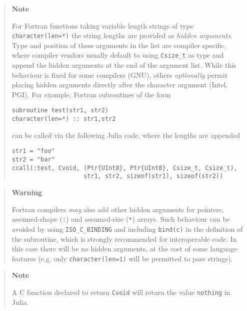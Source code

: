 \begin{quote}
\textbf{Note}

For Fortran functions taking variable length strings of type \texttt{character(len=*)} the string lengths are provided as \emph{hidden arguments}. Type and position of these arguments in the list are compiler specific, where compiler vendors usually default to using \texttt{Csize\_t} as type and append the hidden arguments at the end of the argument list. While this behaviour is fixed for some compilers (GNU), others \emph{optionally} permit placing hidden arguments directly after the character argument (Intel, PGI). For example, Fortran subroutines of the form


\begin{lstlisting}
subroutine test(str1, str2)
character(len=*) :: str1,str2
\end{lstlisting}

can be called via the following Julia code, where the lengths are appended


\begin{verbatim}
str1 = "foo"
str2 = "bar"
ccall(:test, Cvoid, (Ptr{UInt8}, Ptr{UInt8}, Csize_t, Csize_t),
                    str1, str2, sizeof(str1), sizeof(str2))
\end{verbatim}

\end{quote}


\begin{quote}
\textbf{Warning}

Fortran compilers \emph{may} also add other hidden arguments for pointers, assumed-shape (\texttt{:}) and assumed-size (\texttt{*}) arrays. Such behaviour can be avoided by using \texttt{ISO\_C\_BINDING} and including \texttt{bind(c)} in the definition of the subroutine, which is strongly recommended for interoperable code. In this case there will be no hidden arguments, at the cost of some language features (e.g. only \texttt{character(len=1)} will be permitted to pass strings).

\end{quote}


\begin{quote}
\textbf{Note}

A C function declared to return \texttt{Cvoid} will return the value \texttt{nothing} in Julia.

\end{quote}


\hypertarget{8277927636807308593}{}


